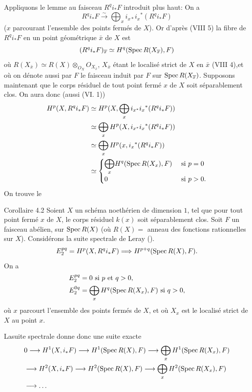 \documentclass[10pt]{../fichiers-configuration-latex/smfart}
\begin{document}
\subsubsection{}
Appliquons le lemme au faisceau $R^qi_{\ast}F$ introduit plus haut: On
a
$$
R^qi_{\ast}F\xrightarrow{\sim} \bigoplus_x i_{x\ast} i_x{}^\ast
(R^qi_{\ast}F)
$$
($x$ parcourant l'ensemble des points fermés de $X$). Or d'après (VIII
5) la fibre de $R^qi_{\ast}F$ en un point géométrique $\bar{x}$ de $X$
est
$$
(R^qi_{\ast}F)_{\overline{x}}\simeq H^q(\operatorname{Spec} R(X_{\overline{x}}), F)
$$
où $R(X_{\bar{x}})\simeq R(X)\otimes_{O_X}O_{X_{\bar{x}}}$,
$X_{\bar{x}}$ étant le localisé strict de $X$ en $\bar{x}$  (VIII
4),\pageoriginale et où on dénote aussi par $F$ le faisceau induit par
$F$ sur $\operatorname{Spec} R(X_{\overline{x}})$. Supposons maintenant que le corps
résiduel de tout point fermé $x$ de $X$ soit séparablement clos. On
aura donc (\cf aussi (VI. 1))
\begin{align*}
H^p(X,R^qi_{\ast}F) &\simeq H^p(X,\bigoplus_x i_{x^{\ast}}i_x{}^\ast
(R^qi_{\ast}F))\\
&\simeq \bigoplus_x H^p(X, i_{x^{\ast}}i_x{}^\ast(R^q i_{\ast}F))\\
&\simeq \bigoplus_x H^p(x,i_x{}^\ast (R^q i_{\ast}F))\\
&\simeq \begin{cases}
         \displaystyle{\bigoplus_x} H^q(\operatorname{Spec} R(X_x),F) &\mbox{ si } p=0\\
          0                            &\mbox{ si } p>0{}.
         \end{cases}
\end{align*}
On trouve le

\begin{enonce*}{Corollaire 4.2}
Soient $X$ un schéma noethérien de dimension $1$, tel que pour tout
point fermé $x$ de $X$, le corps résiduel $k(x)$ soit séparablement
clos. Soit $F$ un faisceau abélien, sur $\operatorname{Spec} R(X)$ (où $R(X)=$
anneau des fonctions rationnelles sur $X$). Considérons la suite
spectrale de Leray (\quad).
$$
E^{pq}_2=H^p(X,R^q i_{\ast}F)\Longrightarrow H^{p+q}(\operatorname{Spec} R(X),
F){}.
$$
On a
\begin{align*}
E^{pq}_2 &= 0\mbox{ si } p \mbox{ et } q> 0{},\\
E^{0q}_2 &= \bigoplus_x H^q(\operatorname{Spec} R(X_x),F)\mbox{ si } q>0{},
\end{align*}
où $x$ parcourt l'ensemble des points fermés de $X$, et où $X_x$ est
le localisé strict de $X$ au point $x$.

La\pageoriginale suite spectrale donne donc une suite exacte
\begin{align*}
& 0\longrightarrow H^1(X,i_{\ast}F)\longrightarrow H^1(\operatorname{Spec} R(X),
F)\longrightarrow \bigoplus_x H^1(\operatorname{Spec} R(X_x),F)\\
& \longrightarrow H^2(X,i_{\ast}F)\longrightarrow H^2(\operatorname{Spec}
R(X),F)\longrightarrow \bigoplus_x H^2(\operatorname{Spec} R(X_x),F)\\
&\longrightarrow\dots
\end{align*}
\end{enonce*}
\end{document}
